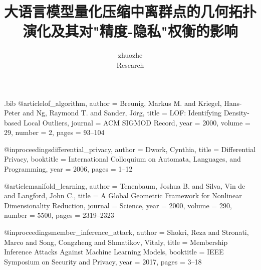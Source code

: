 \begin{filecontents}{\jobname.bib}
@article{lof_algorithm,
  author =       {Breunig, Markus M. and Kriegel, Hans-Peter and Ng, Raymond T. and Sander, Jörg},
  title =        {LOF: Identifying Density-based Local Outliers},
  journal =      {ACM SIGMOD Record},
  year =         2000,
  volume =       29,
  number =       2,
  pages =        {93--104}
}

@inproceedings{differential_privacy,
  author =       {Dwork, Cynthia},
  title =        {Differential Privacy},
  booktitle =    {International Colloquium on Automata, Languages, and Programming},
  year =         2006,
  pages =        {1--12}
}

@article{manifold_learning,
  author =       {Tenenbaum, Joshua B. and Silva, Vin de and Langford, John C.},
  title =        {A Global Geometric Framework for Nonlinear Dimensionality Reduction},
  journal =      {Science},
  year =         2000,
  volume =       290,
  number =       5500,
  pages =        {2319--2323}
}

@inproceedings{member_inference_attack,
  author =       {Shokri, Reza and Stronati, Marco and Song, Congzheng and Shmatikov, Vitaly},
  title =        {Membership Inference Attacks Against Machine Learning Models},
  booktitle =    {IEEE Symposium on Security and Privacy},
  year =         2017,
  pages =        {3--18}
}
\end{filecontents}



\date{}

\title{\Large \bf 大语言模型量化压缩中离群点的几何拓扑演化及其对"精度-隐私"权衡的影响}

\author{
{\rm zhuozhe}\\
 Research
} %

\maketitle

